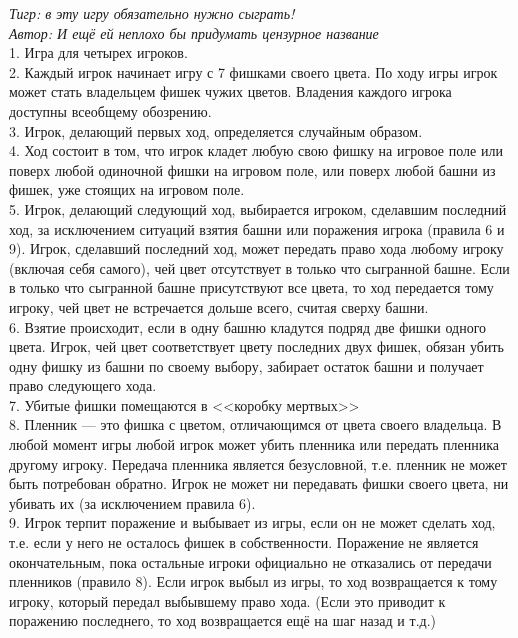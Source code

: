 \begin{problem} 
{\it Тигр: в эту игру обязательно нужно сыграть!}\\
{\it Автор: И ещё ей неплохо бы придумать цензурное название}\\
1. Игра для четырех игроков.\\
2. Каждый игрок начинает игру с 7 фишками своего цвета. По ходу игры игрок может стать владельцем фишек чужих цветов. Владения каждого игрока доступны всеобщему обозрению.\\
3. Игрок, делающий первых ход, определяется случайным образом.\\
4. Ход состоит в том, что игрок кладет любую свою фишку на игровое поле или поверх любой одиночной фишки на игровом поле, или поверх любой башни из фишек, уже стоящих на игровом поле.\\
5. Игрок, делающий следующий ход, выбирается игроком, сделавшим последний ход, за исключением ситуаций взятия башни или поражения игрока (правила 6 и 9). Игрок, сделавший последний ход, может передать право хода любому игроку (включая себя самого), чей цвет отсутствует в только что сыгранной башне. Если в только что сыгранной башне присутствуют все цвета, то ход передается тому игроку, чей цвет не встречается дольше всего, считая сверху башни.\\
6. Взятие происходит, если в одну башню кладутся подряд две фишки одного цвета. Игрок, чей цвет соответствует цвету последних двух фишек, обязан убить одну фишку из башни по своему выбору, забирает остаток башни и получает право следующего хода.\\
7. Убитые фишки помещаются в <<коробку мертвых>>\\
8. Пленник --- это фишка с цветом, отличающимся от цвета своего владельца. В любой момент игры любой игрок может убить пленника или передать пленника другому игроку. Передача пленника является безусловной, т.е. пленник не может быть потребован обратно. Игрок не может ни передавать фишки своего цвета, ни убивать их (за исключением правила 6).\\
9. Игрок терпит поражение и выбывает из игры, если он не может сделать ход, т.е. если у него не осталось фишек в собственности. Поражение не является окончательным, пока остальные игроки официально не отказались от передачи пленников (правило 8). Если игрок выбыл из игры, то ход возвращается к тому игроку, который передал выбывшему право хода. (Если это приводит к поражению последнего, то ход возвращается ещё на шаг назад и т.д.)\\

\end{problem}

